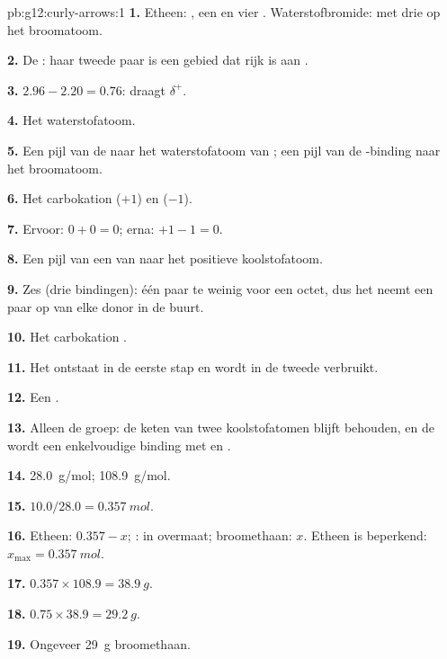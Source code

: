 \begin{solution}{pb:g12:curly-arrows:1}
\textbf{1.} Etheen: , een  en vier .
Waterstofbromide:  met drie  op het
broomatoom.

\textbf{2.} De : haar tweede paar is een gebied dat rijk
is aan .

\textbf{3.} $2.96 - 2.20 = 0.76$:  draagt $\delta^+$.

\textbf{4.} Het waterstofatoom.

\textbf{5.} Een pijl van de  naar het waterstofatoom van
; een pijl van de -binding naar het broomatoom.

\textbf{6.} Het carbokation  ($+1$) en  ($-1$).

\textbf{7.} Ervoor: $0 + 0 = 0$; erna: $+1 - 1 = 0$.

\textbf{8.} Een pijl van een  van  naar het
positieve koolstofatoom.

\textbf{9.} Zes (drie bindingen): één paar te weinig voor een octet, dus
het neemt een paar op van elke donor in de buurt.

\textbf{10.} Het carbokation .

\textbf{11.} Het ontstaat in de eerste stap en wordt in de tweede
verbruikt.

\textbf{12.} Een .

\textbf{13.} Alleen de groep: de keten van twee koolstofatomen blijft
behouden, en de  wordt een enkelvoudige binding met
 en .

\textbf{14.} \qty{28.0}{g/mol}; \qty{108.9}{g/mol}.

\textbf{15.} $10.0 / 28.0 = \qty{0.357}{mol}$.

\textbf{16.} Etheen: $0.357 - x$; : in overmaat; broomethaan: $x$.
Etheen is beperkend: $x_{\max} = \qty{0.357}{mol}$.

\textbf{17.} $0.357 \times 108.9 = \qty{38.9}{g}$.

\textbf{18.} $0.75 \times 38.9 = \qty{29.2}{g}$.

\textbf{19.} Ongeveer \qty{29}{g} broomethaan.
\end{solution}
